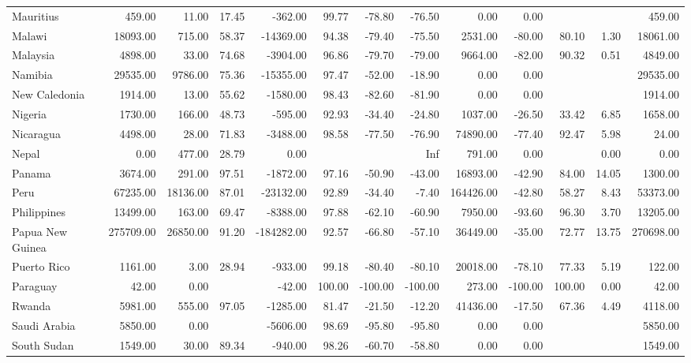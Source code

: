 \begin{table}[ht]
\begin{tabular}{lrrrrrrrrrrrr}
  Mauritius & 459.00 & 11.00 & 17.45 & -362.00 & 99.77 & -78.80 & -76.50 & 0.00 & 0.00 &  &  & 459.00 \\ 
  Malawi & 18093.00 & 715.00 & 58.37 & -14369.00 & 94.38 & -79.40 & -75.50 & 2531.00 & -80.00 & 80.10 & 1.30 & 18061.00 \\ 
  Malaysia & 4898.00 & 33.00 & 74.68 & -3904.00 & 96.86 & -79.70 & -79.00 & 9664.00 & -82.00 & 90.32 & 0.51 & 4849.00 \\ 
  Namibia & 29535.00 & 9786.00 & 75.36 & -15355.00 & 97.47 & -52.00 & -18.90 & 0.00 & 0.00 &  &  & 29535.00 \\ 
  New Caledonia & 1914.00 & 13.00 & 55.62 & -1580.00 & 98.43 & -82.60 & -81.90 & 0.00 & 0.00 &  &  & 1914.00 \\ 
  Nigeria & 1730.00 & 166.00 & 48.73 & -595.00 & 92.93 & -34.40 & -24.80 & 1037.00 & -26.50 & 33.42 & 6.85 & 1658.00 \\ 
  Nicaragua & 4498.00 & 28.00 & 71.83 & -3488.00 & 98.58 & -77.50 & -76.90 & 74890.00 & -77.40 & 92.47 & 5.98 & 24.00 \\ 
  Nepal & 0.00 & 477.00 & 28.79 & 0.00 &  &  & Inf & 791.00 & 0.00 &  & 0.00 & 0.00 \\ 
  Panama & 3674.00 & 291.00 & 97.51 & -1872.00 & 97.16 & -50.90 & -43.00 & 16893.00 & -42.90 & 84.00 & 14.05 & 1300.00 \\ 
  Peru & 67235.00 & 18136.00 & 87.01 & -23132.00 & 92.89 & -34.40 & -7.40 & 164426.00 & -42.80 & 58.27 & 8.43 & 53373.00 \\ 
  Philippines & 13499.00 & 163.00 & 69.47 & -8388.00 & 97.88 & -62.10 & -60.90 & 7950.00 & -93.60 & 96.30 & 3.70 & 13205.00 \\ 
  Papua New Guinea & 275709.00 & 26850.00 & 91.20 & -184282.00 & 92.57 & -66.80 & -57.10 & 36449.00 & -35.00 & 72.77 & 13.75 & 270698.00 \\ 
  Puerto Rico & 1161.00 & 3.00 & 28.94 & -933.00 & 99.18 & -80.40 & -80.10 & 20018.00 & -78.10 & 77.33 & 5.19 & 122.00 \\ 
  Paraguay & 42.00 & 0.00 &  & -42.00 & 100.00 & -100.00 & -100.00 & 273.00 & -100.00 & 100.00 & 0.00 & 42.00 \\ 
  Rwanda & 5981.00 & 555.00 & 97.05 & -1285.00 & 81.47 & -21.50 & -12.20 & 41436.00 & -17.50 & 67.36 & 4.49 & 4118.00 \\ 
  Saudi Arabia & 5850.00 & 0.00 &  & -5606.00 & 98.69 & -95.80 & -95.80 & 0.00 & 0.00 &  &  & 5850.00 \\ 
  South Sudan & 1549.00 & 30.00 & 89.34 & -940.00 & 98.26 & -60.70 & -58.80 & 0.00 & 0.00 &  &  & 1549.00 \\ 

\end{tabular}
\end{table}
